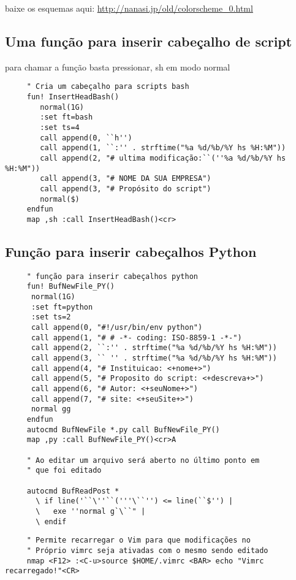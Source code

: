 baixe os esquemas aqui:
\url{http://nanasi.jp/old/colorscheme_0.html}

\subsection{Uma função para inserir cabeçalho de script}
\label{Uma função para inserir cabeçalho de script bash}
para chamar a função
basta pressionar, sh em modo normal

\begin{verbatim}
     " Cria um cabeçalho para scripts bash
     fun! InsertHeadBash()
        normal(1G)
        :set ft=bash
        :set ts=4
        call append(0, ``h'')
        call append(1, ``:'' . strftime("%a %d/%b/%Y hs %H:%M"))
        call append(2, "# ultima modificação:``(''%a %d/%b/%Y hs %H:%M"))
        call append(3, "# NOME DA SUA EMPRESA")
        call append(3, "# Propósito do script")
        normal($)
     endfun
     map ,sh :call InsertHeadBash()<cr>
\end{verbatim}

\subsection{Função para inserir cabeçalhos Python}
\label{Função para inserir cabeçalhos python}

\begin{verbatim}
     " função para inserir cabeçalhos python
     fun! BufNewFile_PY()
      normal(1G)
      :set ft=python
      :set ts=2
      call append(0, "#!/usr/bin/env python")
      call append(1, "# # -*- coding: ISO-8859-1 -*-")
      call append(2, ``:'' . strftime("%a %d/%b/%Y hs %H:%M"))
      call append(3, `` '' . strftime("%a %d/%b/%Y hs %H:%M"))
      call append(4, "# Instituicao: <+nome+>")
      call append(5, "# Proposito do script: <+descreva+>")
      call append(6, "# Autor: <+seuNome+>")
      call append(7, "# site: <+seuSite+>")
      normal gg
     endfun
     autocmd BufNewFile *.py call BufNewFile_PY()
     map ,py :call BufNewFile_PY()<cr>A
   
     " Ao editar um arquivo será aberto no último ponto em
     " que foi editado
   
     autocmd BufReadPost *
       \ if line('``\''``('''\``'') <= line(``$'') |
       \   exe ''normal g`\``" |
       \ endif
\end{verbatim}

\begin{verbatim}
     " Permite recarregar o Vim para que modificações no
     " Próprio vimrc seja ativadas com o mesmo sendo editado
     nmap <F12> :<C-u>source $HOME/.vimrc <BAR> echo "Vimrc recarregado!"<CR>
\end{verbatim}

